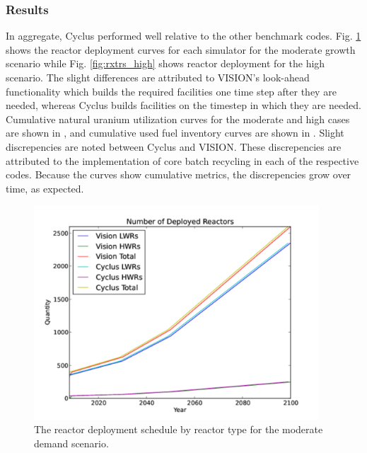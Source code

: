 \subsubsection{Results}


In aggregate, Cyclus performed well relative to the other benchmark
codes. Fig. \ref{fig:rxtrs_low} shows the reactor deployment curves for each
simulator for the moderate growth scenario while Fig. \ref{fig:rxtrs_high} shows
reactor deployment for the high scenario. The slight differences are attributed
to VISION's look-ahead functionality which builds the required facilities one
time step after they are needed, whereas Cyclus builds facilities on the
timestep in which they are needed. Cumulative natural uranium utilization curves
for the moderate and high cases are shown in ,
and cumulative used fuel inventory curves are shown in
. Slight discrepencies are noted
between Cyclus and VISION. These discrepencies are attributed to the
implementation of core batch recycling in each of the respective codes. Because
the curves show cumulative metrics, the discrepencies grow over time, as
expected.

\begin{figure}
  \begin{center}
    \includegraphics[height=8cm]{./figs/rxtrs_low.pdf}
    \caption{The reactor deployment schedule by reactor type for the moderate demand scenario.}
    \label{fig:rxtrs_low}
  \end{center}  
\end{figure}

